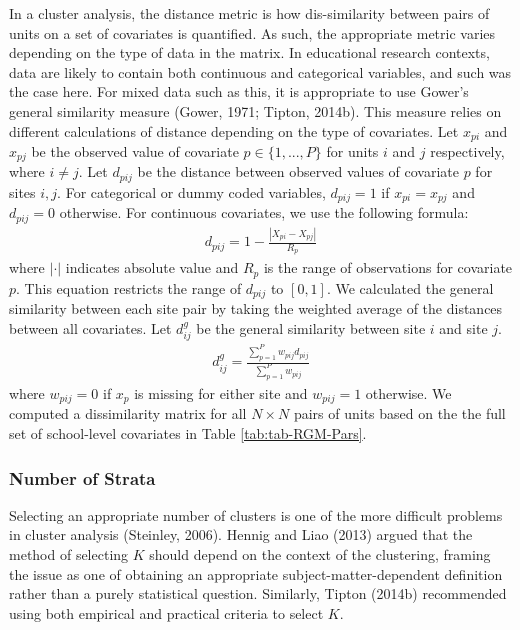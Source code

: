 \documentclass[
  man,floatsintext]{apa6}
\begin{document}
In a cluster analysis, the distance metric is how dis-similarity between pairs of units on a set of covariates is quantified. As such, the appropriate metric varies depending on the type of data in the matrix.
In educational research contexts, data are likely to contain both continuous and categorical variables, and such was the case here. For mixed data such as this, it is appropriate to use Gower's general similarity measure (Gower, 1971; Tipton, 2014b). This measure relies on different calculations of distance depending on the type of covariates. Let \(x_{pi}\) and \(x_{pj}\) be the observed value of covariate \(p \in \{1, ..., P\}\) for units \(i\) and \(j\) respectively, where \(i \ne j\). Let \(d_{pij}\) be the distance between observed values of covariate \(p\) for sites \(i,j\). For categorical or dummy coded variables, \(d_{pij} = 1\) if \(x_{pi} = x_{pj}\) and \(d_{pij} = 0\) otherwise. For continuous covariates, we use the following formula:
\begin{align}
\label{eq:gowerdist-p}
d_{pij} = 1 - \frac{|X_{pi} - X_{pj}|}{R_p}
\end{align}
where \(|\cdot|\) indicates absolute value and \(R_p\) is the range of observations for covariate \(p\). This equation restricts the range of \(d_{pij}\) to \([0,1]\). We calculated the general similarity between each site pair by taking the weighted average of the distances between all covariates. Let \(d^{g}_{ij}\) be the general similarity between site \(i\) and site \(j\).
\begin{align}
\label{eq:gowerdist}
d^{g}_{ij} = \frac{\sum^P_{p = 1} w_{pij} d_{pij}}{\sum^P_{p = 1} w_{pij}}
\end{align}
where \(w_{pij} = 0\) if \(x_p\) is missing for either site and \(w_{pij} = 1\) otherwise.
We computed a dissimilarity matrix for all \(N \times N\) pairs of units based on the the full set of school-level covariates in Table \ref{tab:tab-RGM-Pars}.

\hypertarget{number-of-strata}{%
\subsubsection{Number of Strata}\label{number-of-strata}}

Selecting an appropriate number of clusters is one of the more difficult problems in cluster analysis (Steinley, 2006). Hennig and Liao (2013) argued that the method of selecting \(K\) should depend on the context of the clustering, framing the issue as one of obtaining an appropriate subject-matter-dependent definition rather than a purely statistical question. Similarly, Tipton (2014b) recommended using both empirical and practical criteria to select \(K\).
\end{document}
